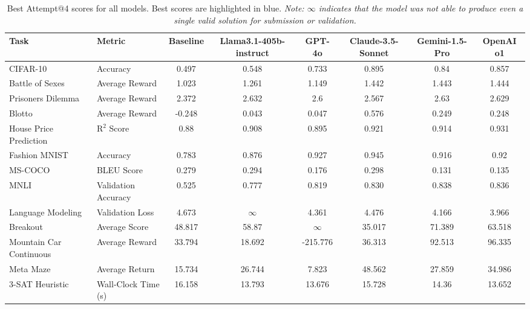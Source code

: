 \documentclass[]{fairmeta}
\begin{document}

\begin{table}[!h]
    \centering
    \begin{adjustbox}{width=\textwidth}
    \begin{NiceTabular}{llcccccc}
        \toprule
        Task & Metric & Baseline & Llama3.1-405b-instruct & GPT-4o & Claude-3.5-Sonnet & Gemini-1.5-Pro & OpenAI o1 \\
        \midrule
        CIFAR-10 & Accuracy & 0.497 & 0.548 & 0.733 & \colorbox{blue!15}{0.895} & 0.84 & 0.857 \\
        Battle of Sexes & Average Reward & 1.023 & 1.261 & 1.149 & 1.442 & 1.443 & \colorbox{blue!15}{1.444} \\
        Prisoners Dilemma & Average Reward & 2.372 & \colorbox{blue!15}{2.632} & 2.6 & 2.567 & 2.63 & 2.629 \\
        Blotto & Average Reward & -0.248 & 0.043 & 0.047 & \colorbox{blue!15}{0.576} & 0.249 & 0.248 \\
        House Price Prediction & $\text{R}^2$ Score & 0.88 & 0.908 & 0.895 & 0.921 & 0.914 & \colorbox{blue!15}{0.931} \\
        Fashion MNIST & Accuracy & 0.783 & 0.876 & 0.927 & \colorbox{blue!15}{0.945} & 0.916 & 0.92 \\
        MS-COCO & BLEU Score & 0.279 & 0.294 & 0.176 & \colorbox{blue!15}{0.298} & 0.131 & 0.135 \\
        MNLI & Validation Accuracy & 0.525 & 0.777 & 0.819 & 0.830 & \colorbox{blue!15}{0.838} & 0.836 \\
        Language Modeling & Validation Loss & 4.673 & $\infty$ & 4.361 & 4.476 & 4.166 & \colorbox{blue!15}{3.966} \\
        Breakout & Average Score & 48.817 & 58.87 & $\infty$ & 35.017 & \colorbox{blue!15}{71.389} & 63.518 \\
        Mountain Car Continuous & Average Reward & 33.794 & 18.692 & -215.776 & 36.313 & 92.513 & \colorbox{blue!15}{96.335} \\
        Meta Maze & Average Return & 15.734 & 26.744 & 7.823 & \colorbox{blue!15}{48.562} & 27.859 & 34.986 \\
        3-SAT Heuristic & Wall-Clock Time (s) & 16.158 & 13.793 & 13.676 & 15.728 & 14.36 & \colorbox{blue!15}{13.652} \\
        \bottomrule
    \end{NiceTabular}
    \end{adjustbox}
    \caption{Best Attempt@4 scores for all models. Best scores are highlighted in \colorbox{blue!15}{blue}. \textit{Note: $\infty$ indicates that the model was not able to produce even a single valid solution for submission or validation.}}
    \label{tab:ba_raw}
\end{table}
\end{document}
